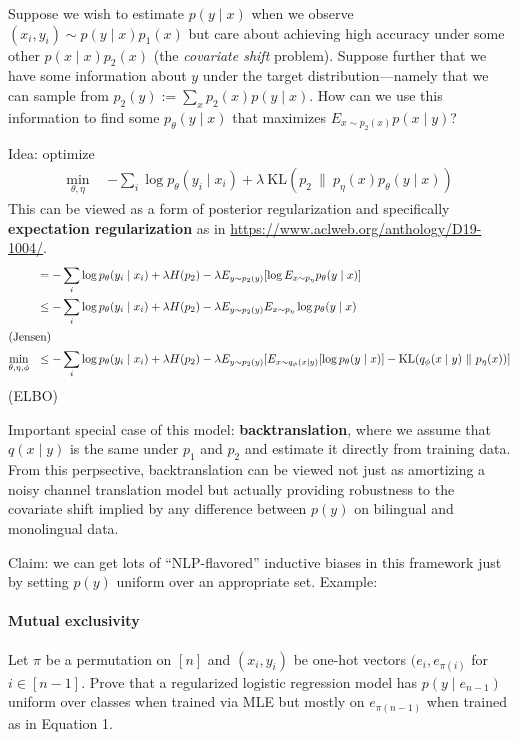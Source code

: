 \documentclass{article}
\newcommand{\KL}[2]{\mathrm{KL}(#1~\|~#2)}
\begin{document}
Suppose we wish to estimate $p(y \mid x)$ when we observe $(x_i, y_i) \sim p(y
\mid x) p_1(x) $ but care about achieving high accuracy under some other $p(x
\mid x) p_2(x)$ (the \emph{covariate shift} problem). Suppose further that we
have some information about $y$ under the target distribution---namely that we
can sample from $p_2(y) := \sum_x p_2(x) p(y \mid x)$. How can we use this
information to find some $p_\theta(y \mid x)$ that maximizes $E_{x \sim p_2(x)} p(x
\mid y)$?

Idea: optimize
\begin{align}
  \min_{\theta,\eta} ~~ &-\sum_i \log p_\theta(y_i \mid x_i) + \lambda~\KL{p_2}{p_\eta(x)
  p_\theta(y \mid x)}
\end{align}
This can be viewed as a form of posterior regularization and specifically
\textbf{expectation regularization} as in
\url{https://www.aclweb.org/anthology/D19-1004/}.
\begin{align}
  &= -\sum_i \log p_\theta(y_i \mid x_i) + \lambda H(p_2) - \lambda E_{y \sim p_2(y)}
  [\log E_{x \sim p_\eta} p_\theta(y \mid x)] \\
  &\leq -\sum_i \log p_\theta(y_i \mid x_i) + \lambda H(p_2) -  \lambda E_{y \sim p_2(y)}
  E_{x \sim p_\eta} \log p_\theta(y \mid x) \\
  \intertext{(Jensen)}
  \min_{\theta, \eta, \phi} ~~ &\leq -\sum_i \log p_\theta(y_i \mid x_i) + \lambda H(p_2) -  \lambda E_{y \sim p_2(y)}[
  E_{x \sim q_\phi(x \mid y)} [\log p_\theta(y \mid x)] - \KL{q_\phi(x \mid y)}
  {p_\eta(x)}]
\end{align}
(ELBO)

Important special case of this model: \textbf{backtranslation}, where we assume
that $q(x \mid y)$ is the same under $p_1$ and $p_2$ and estimate it directly
from training data. From this perpsective, backtranslation can be viewed not
just as amortizing a noisy channel translation model but actually providing
robustness to the covariate shift implied by any difference between $p(y)$ on
bilingual and monolingual data.

Claim: we can get lots of ``NLP-flavored'' inductive biases in this framework
just by setting $p(y)$ uniform over an appropriate set. Example:

\paragraph{Mutual exclusivity}
Let $\pi$ be a permutation on $[n]$ and $(x_i, y_i)$ be one-hot vectors $(e_i,
e_{\pi(i)}$ for $i \in [n-1]$. Prove that a regularized logistic regression
model has $p(y \mid e_{n-1})$ uniform over classes when trained via MLE but
mostly on $e_{\pi(n-1)}$ when trained as in Equation 1.
\end{document}
